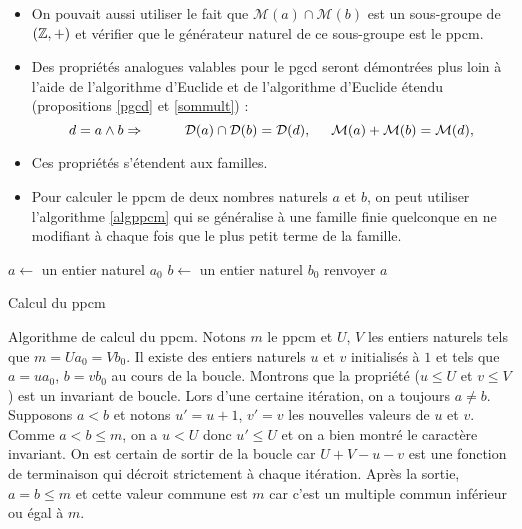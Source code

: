 \begin{rems}
\begin{itemize}
  \item On pouvait aussi utiliser le fait que $\mathcal{M}(a)\cap \mathcal{M}(b)$ est un sous-groupe de $(\mathbb{Z},+)$ et vérifier que le générateur naturel de ce sous-groupe est le ppcm.
  \item Des propriétés analogues valables pour le pgcd seront démontrées plus loin à l'aide de l'algorithme d'Euclide et de l'algorithme d'Euclide étendu (propositions \ref{pgcd} et \ref{sommult}) :
\begin{displaymath}
d=a\wedge b \Rightarrow \hspace{1cm} \mathcal D(a)\cap \mathcal D(b)=\mathcal D(d),\hspace{0.5cm} \mathcal{M}(a) + \mathcal{M}(b) = \mathcal{M}(d), 
\end{displaymath}
  \item Ces propriétés s'étendent aux familles.
  \item Pour calculer le ppcm de deux nombres naturels $a$ et $b$, on peut utiliser l'algorithme \ref{algppcm} qui se généralise à une famille finie quelconque en ne modifiant à chaque fois que le plus petit terme de la famille.
\end{itemize}
\end{rems}

\begin{algorithm}
 $a\leftarrow$ un entier naturel $a_0$\;
 $b\leftarrow$ un entier naturel $b_0$\;
  renvoyer $a$\;
 \caption{Calcul du ppcm}
 \label{algppcm}
\end{algorithm} 
\begin{demo}
 Algorithme de calcul du ppcm.\newline
Notons $m$ le ppcm et $U$, $V$ les entiers naturels tels que $m = Ua_0 = V b_0$. 
Il existe des entiers naturels $u$ et $v$ initialisés à $1$ et tels que $a = u a_0$, $b = v b_0$ au cours de la boucle.  Montrons que la propriété ($u \leq U$ et $v\leq V$) est un invariant de boucle.\newline
Lors d'une certaine itération, on a toujours $a\neq b$. Supposons $a < b$ et notons $u' = u + 1$, $v' = v$ les nouvelles valeurs de $u$ et $v$. Comme $a < b \leq m$, on a $u < U$ donc $u' \leq U$ et on a bien montré le caractère invariant.\newline
On est certain de sortir de la boucle car $U + V -u -v$ est une fonction de terminaison qui décroit strictement à chaque itération. Après la sortie, $a=b\leq m$ et cette valeur commune est $m$ car c'est un multiple commun inférieur ou égal à $m$. 
\end{demo}

